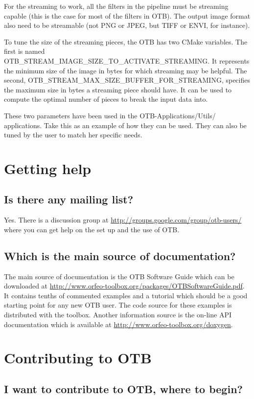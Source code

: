 For the streaming to work, all the filters in the pipeline must be streaming capable
(this is the case for most of the filters in OTB). The output image format also need to be
streamable (not PNG or JPEG, but TIFF or ENVI, for instance).

To tune the size of the streaming pieces, the OTB has
two CMake variables. The first is named
OTB\_STREAM\_IMAGE\_SIZE\_TO\_ACTIVATE\_STREAMING. It represents the
minimum size of the image in bytes for which streaming may be helpful. The
second, OTB\_STREAM\_MAX\_SIZE\_BUFFER\_FOR\_STREAMING, specifies the
maximum size in bytes a streaming piece should have. It can be used to
compute the optimal number of pieces to break the input data into.

These two parameters have been used in the OTB-Applications/Utils/
applications. Take this as an example of how they can be used. They
can also be tuned by the user to match her specific needs.


\section{Getting help}
\subsection{Is there any mailing list?}
Yes. There is a discussion group at
\url{http://groups.google.com/group/otb-users/} where you can get help
on the set up and the use of OTB.

\subsection{Which is the main source of documentation?}
The main source of documentation is the OTB Software Guide which can
be downloaded at
\url{http://www.orfeo-toolbox.org/packages/OTBSoftwareGuide.pdf}. It
contains tenths of commented examples and a tutorial which should be a good starting
point for any new OTB user. The code source for these examples is
distributed with the toolbox. Another information source is the
on-line API documentation which is available at \url{http://www.orfeo-toolbox.org/doxygen}.

\section{Contributing to OTB}\label{sec:contributing}

\subsection{I want to contribute to OTB, where to begin?}

